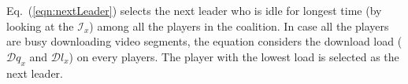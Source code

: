 Eq.~(\ref{eqn:nextLeader}) selects the next leader who is idle for longest time (by looking at the $\mathcal{I}_x$) among all the players in the coalition. In case all the players are busy downloading video segments, the equation considers the download load ($\mathcal{D}{q_x}$ and $\mathcal{D}{l_x}$) on every players. The player with the lowest load is selected as the next leader. 
